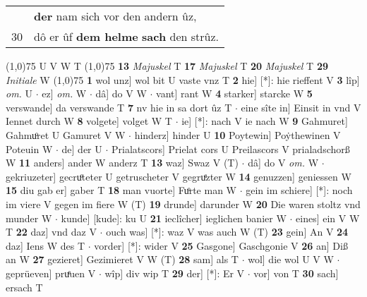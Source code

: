 \documentclass[8pt,a4paper,notitlepage]{article}
\begin{document}
\begin{table}[ht]
\begin{minipage}[t]{0.5\linewidth}
\begin{tabular}{rl}
 & \textbf{der} nam sich vor den andern ûz,\\ 
30 & dô er ûf \textbf{dem helme} \textbf{sach} den strûz.\\ 
\end{tabular}
\scriptsize
\line(1,0){75} \newline
U V W T \newline
\line(1,0){75} \newline
\textbf{13} \textit{Majuskel} T  \textbf{17} \textit{Majuskel} T  \textbf{20} \textit{Majuskel} T  \textbf{29} \textit{Initiale} W  \newline
\line(1,0){75} \newline
\textbf{1} wol unz] wol bit U vaste vnz T \textbf{2} hie] [*]: hie rieffent V \textbf{3} lîp] \textit{om.} U  $\cdot$ ez] \textit{om.} W  $\cdot$ dâ] do V W  $\cdot$ vant] rant W \textbf{4} starker] starcke W \textbf{5} verswande] da verswande T \textbf{7} nv hie in sa dort ûz T  $\cdot$ eine sîte in] Einsit in vnd V Iennet durch W \textbf{8} volgete] volget W T  $\cdot$ ie] [*]: nach V ie nach W \textbf{9} Gahmuret] Gahmuͦret U Gamuret V W  $\cdot$ hinderz] hinder U \textbf{10} Poytewin] Poẏthewinen V Poteuin W  $\cdot$ de] der U  $\cdot$ Prialatscors] Prielat cors U Preilascors V prialadschorß W \textbf{11} anders] ander W anderz T \textbf{13} waz] Swaz V (T)  $\cdot$ dâ] do V \textit{om.} W  $\cdot$ gekriuzeter] gecruͦteter U getruscheter V gegruͤzter W \textbf{14} genuzzen] geniessen W \textbf{15} diu gab er] gaber T \textbf{18} man vuorte] Fuͦrte man W  $\cdot$ gein im schiere] [*]: noch im viere V gegen im fiere W (T) \textbf{19} drunde] darunder W \textbf{20} Die waren stoltz vnd munder W  $\cdot$ kunde] [kude]: ku U \textbf{21} ieclîcher] ieglichen banier W  $\cdot$ eines] ein V W T \textbf{22} daz] vnd daz V  $\cdot$ ouch was] [*]: waz V was auch W (T) \textbf{23} gein] An V \textbf{24} daz] Iens W des T  $\cdot$ vorder] [*]: wider V \textbf{25} Gasgone] Gaschgonie V \textbf{26} an] Diß an W \textbf{27} gezieret] Gezimieret V W (T) \textbf{28} sam] als T  $\cdot$ wol] die wol U V W  $\cdot$ geprüeven] pruͤuen V  $\cdot$ wîp] div wip T \textbf{29} der] [*]: Er V  $\cdot$ vor] von T \textbf{30} sach] ersach T \newline
\end{minipage}
\end{table}
\end{document}
